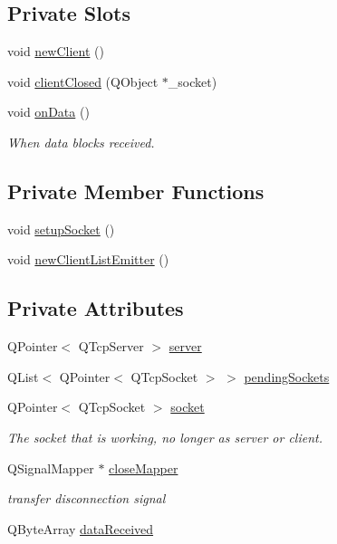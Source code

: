 \subsection*{Private Slots}
\begin{DoxyCompactItemize}
\item 
void \hyperlink{classRemoteInput_a9185f78a38ff6504229604c90236d78b}{new\+Client} ()
\item 
void \hyperlink{classRemoteInput_a8d09dd6f3f7cd07bfd09a31c2ed47856}{client\+Closed} (Q\+Object $\ast$\+\_\+socket)
\item 
void \hyperlink{classRemoteInput_ae7ae71e93d5630bf16b2e624046d7560}{on\+Data} ()
\begin{DoxyCompactList}\small\item\em When data blocks received. \end{DoxyCompactList}\end{DoxyCompactItemize}
\subsection*{Private Member Functions}
\begin{DoxyCompactItemize}
\item 
void \hyperlink{classRemoteInput_a102e5869f429f046065582a281854f73}{setup\+Socket} ()
\item 
void \hyperlink{classRemoteInput_a31ec7cb4bea4187c5ad13ef4293c3904}{new\+Client\+List\+Emitter} ()
\end{DoxyCompactItemize}
\subsection*{Private Attributes}
\begin{DoxyCompactItemize}
\item 
Q\+Pointer$<$ Q\+Tcp\+Server $>$ \hyperlink{classRemoteInput_a85fb06e7f927436c6fe959935afa4185}{server}
\item 
Q\+List$<$ Q\+Pointer$<$ Q\+Tcp\+Socket $>$ $>$ \hyperlink{classRemoteInput_a8efa826116b9bed6bce016c4f6aedced}{pending\+Sockets}
\item 
Q\+Pointer$<$ Q\+Tcp\+Socket $>$ \hyperlink{classRemoteInput_a4d02f25eaa512b9dc5459d8296f1d11c}{socket}
\begin{DoxyCompactList}\small\item\em The socket that is working, no longer as server or client. \end{DoxyCompactList}\item 
Q\+Signal\+Mapper $\ast$ \hyperlink{classRemoteInput_a58e7c3fa294e6489d82be7c0aad27fdb}{close\+Mapper}
\begin{DoxyCompactList}\small\item\em transfer disconnection signal \end{DoxyCompactList}\item 
Q\+Byte\+Array \hyperlink{classRemoteInput_a32118b1d5726b5435b43b4a80e2b2532}{data\+Received}
\end{DoxyCompactItemize}


